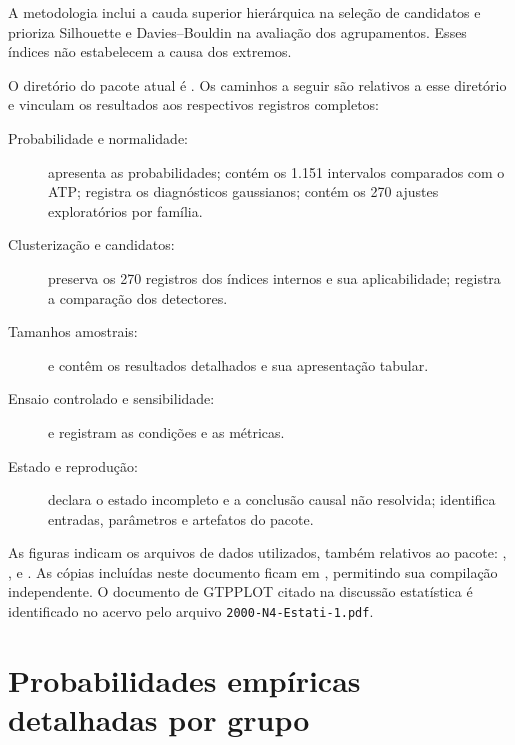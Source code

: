 \documentclass[
	12pt,				%
	openright,			%
	oneside,			%
	a4paper,			%
	chapter=TITLE,		%
	section=TITLE,		%
	subsection=TITLE,	%
	subsubsection=TITLE,%
	english,			%
	brazilian			%
	]{abntex2}
\theoremstyle{definition}
\begin{document}
\begin{apendicesenv}
A metodologia inclui a cauda superior hierárquica na seleção de candidatos e
prioriza Silhouette e Davies--Bouldin na avaliação dos agrupamentos.
Esses índices não estabelecem a causa dos extremos.

O diretório do pacote atual é .
Os caminhos a seguir são relativos a esse diretório e vinculam os
resultados aos respectivos registros completos:
\begin{description}
\item[Probabilidade e normalidade:]
 apresenta as probabilidades;
 contém os 1.151 intervalos
comparados com o ATP;  registra os
diagnósticos gaussianos; 
contém os 270 ajustes exploratórios por família.
\item[Clusterização e candidatos:]
 preserva os 270 registros dos
índices internos e sua aplicabilidade;
 registra a comparação dos detectores.
\item[Tamanhos amostrais:]
 e  contêm
os resultados detalhados e sua apresentação tabular.
\item[Ensaio controlado e sensibilidade:]
 e
 registram as condições e as métricas.
\item[Estado e reprodução:]
 declara o estado incompleto e a conclusão causal
não resolvida;  identifica entradas,
parâmetros e artefatos do pacote.
\end{description}

As figuras indicam os arquivos de dados utilizados, também relativos ao
pacote: ,
,
 e
. As cópias incluídas neste documento ficam
em , permitindo sua compilação independente.
O documento de GTPPLOT citado na discussão estatística é identificado no
acervo pelo arquivo \texttt{2000-N4-Estati-1.pdf}.

\section{Probabilidades empíricas detalhadas por grupo}
\label{app:probabilidades-detalhadas}


\end{apendicesenv}
\end{document}
